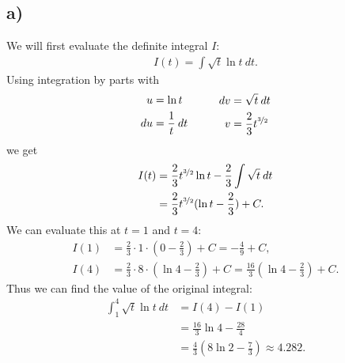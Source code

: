 \documentclass{article}
\begin{document}
\subsection*{a)}
We will first evaluate the definite integral $I$:
\begin{align*}
  I(t)=\int \sqrt{t}\ln t\: dt.
\end{align*}
Using integration by parts with 
\begin{align*}
  \begin{aligned}
    u &= \ln t\\
    du &= \frac{1}{t}\:dt
  \end{aligned}
  \hspace{1cm}
  \begin{aligned}
    dv &= \sqrt{t}\:dt\\
    v &= \frac{2}{3}t^{\nicefrac{3}{2}}
  \end{aligned}
\end{align*}
we get
\begin{align*}
  I(t)&=\frac{2}{3}t^{\nicefrac{3}{2}}\ln t - \frac{2}{3}\int \sqrt{t}\:dt\\
  &=\frac{2}{3}t^{\nicefrac{3}{2}}(\ln t - \frac{2}{3}) + C.
\end{align*}
We can evaluate this at $t=1$ and $t=4$:
\begin{align*}
  I(1)&=\frac{2}{3}\cdot 1\cdot (0-\frac{2}{3})+C=-\frac{4}{9}+C,\\
  I(4)&=\frac{2}{3}\cdot 8\cdot(\ln 4 - \frac{2}{3})+C=\frac{16}{3}(\ln 4 - \frac{2}{3})+C.
\end{align*}
Thus we can find the value of the original integral:
\begin{align*}
  \int_1^4 \sqrt{t}\ln t\:dt &= I(4)-I(1) \\
  &=\frac{16}{3}\ln 4 - \frac{28}{4}\\
  &= \frac{4}{3}(8\ln 2 - \frac{7}{3})\approx 4.282.
\end{align*}
\end{document}
